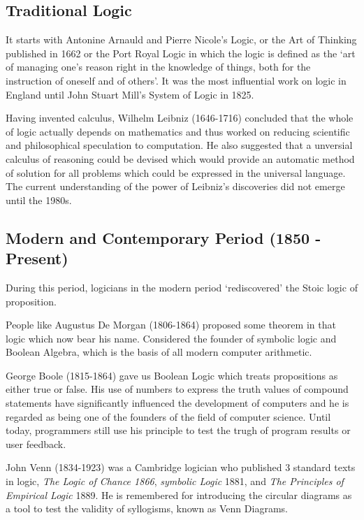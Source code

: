 \documentclass[]{book}
\theoremstyle{definition}
\theoremstyle{definition}
\theoremstyle{definition}
\theoremstyle{remark}
\begin{document}
\subsection{Traditional Logic}\label{traditional-logic}

It starts with Antonine Arnauld and Pierre Nicole's Logic, or the Art of
Thinking published in 1662 or the Port Royal Logic in which the logic is
defined as the `art of managing one's reason right in the knowledge of
things, both for the instruction of oneself and of others'. It was the
most influential work on logic in England until John Stuart Mill's
System of Logic in 1825.

Having invented calculus, Wilhelm Leibniz (1646-1716) concluded that the
whole of logic actually depends on mathematics and thus worked on
reducing scientific and philosophical speculation to computation. He
also suggested that a unversial calculus of reasoning could be devised
which would provide an automatic method of solution for all problems
which could be expressed in the universal language. The current
understanding of the power of Leibniz's discoveries did not emerge until
the 1980s.

\subsection{Modern and Contemporary Period (1850 -
Present)}\label{modern-and-contemporary-period-1850---present}

During this period, logicians in the modern period `rediscovered' the
Stoic logic of proposition.

People like Augustus De Morgan (1806-1864) proposed some theorem in that
logic which now bear his name. Considered the founder of symbolic logic
and Boolean Algebra, which is the basis of all modern computer
arithmetic.

George Boole (1815-1864) gave us Boolean Logic which treats propositions
as either true or false. His use of numbers to express the truth values
of compound statements have significantly influenced the development of
computers and he is regarded as being one of the founders of the field
of computer science. Until today, programmers still use his principle to
test the trugh of program results or user feedback.

John Venn (1834-1923) was a Cambridge logician who published 3 standard
texts in logic, \emph{The Logic of Chance 1866}, \emph{symbolic Logic}
1881, and \emph{The Principles of Empirical Logic} 1889. He is
remembered for introducing the circular diagrams as a tool to test the
validity of syllogisms, known as Venn Diagrams.
\end{document}
